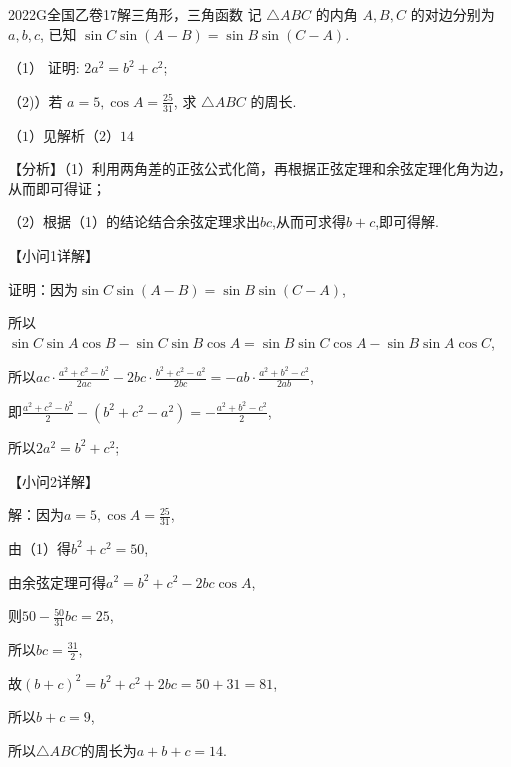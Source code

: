\documentclass[12pt,UTF-8,a4paper]{ctexart}
\numberwithin{figure}{section}
\theoremstyle{mystyle}
\theoremstyle{mystylekaishu}
\theoremstyle{mystyle}
\numberwithin{xiti}{section}
\begin{document}
\begin{problem}{2022}{G}{全国乙卷}{17}{解三角形，三角函数}
记 $\triangle ABC$ 的内角 $A,B,C$ 的对边分别为 $a,b,c$, 已知 $\sin C\sin(A-B)=\sin B\sin(C-A)$.

（1） 证明: $2a^2=b^2+c^2$;

（2)）若 $a=5, \cos A=\frac{25}{31}$, 求 $\triangle ABC$ 的周长.
\end{problem}

\begin{answer}
$（1）见解析
（2）14$
\end{answer}

\begin{solutions}
【分析】（1）利用两角差的正弦公式化简，再根据正弦定理和余弦定理化角为边，从而即可得证；

（2）根据（1）的结论结合余弦定理求出$bc$,从而可求得$b+c$,即可得解.

【小问1详解】

证明：因为$\sin C\sin(A-B)=\sin B\sin(C-A)$,

所以$\sin C\sin A\cos B-\sin C\sin B\cos A=\sin B\sin C\cos A-\sin B\sin A\cos C$,

所以$ac\cdot\frac{a^2+c^2-b^2}{2ac}-2bc\cdot\frac{b^2+c^2-a^2}{2bc}=-ab\cdot\frac{a^2+b^2-c^2}{2ab}$,

即$\frac{a^2+c^2-b^2}{2}-\left(b^2+c^2-a^2\right)=-\frac{a^2+b^2-c^2}{2}$,

所以$2a^2=b^2+c^2$;

【小问2详解】

解：因为$a=5,\cos A=\frac{25}{31}$,

由（1）得$b^2+c^2=50$,

由余弦定理可得$a^2=b^2+c^2-2bc\cos A$,

则$50-\frac{50}{31}bc=25$,

所以$bc=\frac{31}{2}$,

故$(b+c)^2=b^2+c^2+2bc=50+31=81$,

所以$b+c=9$,

所以$\triangle ABC$的周长为$a+b+c=14$.
\end{solutions}

\end{document}
